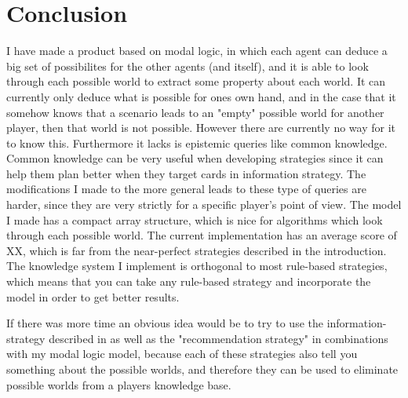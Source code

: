 \section{Conclusion}

I have made a product based on modal logic, in which each agent can deduce a big set of possibilites for the other agents (and itself), and it is able to look through each possible world to extract some property about each world. It can currently only deduce what is possible for ones own hand, and in the case that it somehow knows that a scenario leads to an "empty" possible world for another player, then that world is not possible. However there are currently no way for it to know this. Furthermore it lacks is epistemic queries like common knowledge. Common knowledge can be very useful when developing strategies since it can help them plan better when they target cards in \cite{CoxEtAl2015} information strategy. The modifications I made to the more general \KTfourfiveN leads to these type of queries are harder, since they are very strictly for a specific player's point of view. 
The model I made has a compact array structure, which is nice for algorithms which look through each possible world.
The current implementation has an average score of XX, which is far from the near-perfect strategies described in the introduction. The knowledge system I implement is orthogonal to most rule-based strategies, which means that you can take any rule-based strategy and incorporate the model in order to get better results.

If there was more time an obvious idea would be to try to use the information-strategy described in \cite{CoxEtAl2015} as well as the "recommendation strategy" in combinations with my modal logic model, because each of these strategies also tell you something about the possible worlds, and therefore they can be used to eliminate possible worlds from a players knowledge base.

